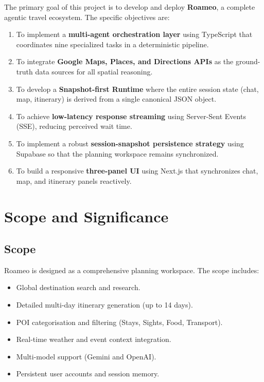 \documentclass[12pt,a4paper]{report}
\begin{document}
The primary goal of this project is to develop and deploy \textbf{Roameo}, a complete agentic travel ecosystem. The specific objectives are:

\begin{enumerate}[leftmargin=*, nosep]
  \item To implement a \textbf{multi-agent orchestration layer} using TypeScript that coordinates nine specialized tasks in a deterministic pipeline.
  \item To integrate \textbf{Google Maps, Places, and Directions APIs} as the ground-truth data sources for all spatial reasoning.
  \item To develop a \textbf{Snapshot-first Runtime} where the entire session state (chat, map, itinerary) is derived from a single canonical JSON object.
  \item To achieve \textbf{low-latency response streaming} using Server-Sent Events (SSE), reducing perceived wait time.
  \item To implement a robust \textbf{session-snapshot persistence strategy} using Supabase so that the planning workspace remains synchronized.
  \item To build a responsive \textbf{three-panel UI} using Next.js that synchronizes chat, map, and itinerary panels reactively.
\end{enumerate}

\section{Scope and Significance}

\subsection{Scope}
Roameo is designed as a comprehensive planning workspace. The scope includes:
\begin{itemize}[nosep]
    \item Global destination search and research.
    \item Detailed multi-day itinerary generation (up to 14 days).
    \item POI categorisation and filtering (Stays, Sights, Food, Transport).
    \item Real-time weather and event context integration.
    \item Multi-model support (Gemini and OpenAI).
    \item Persistent user accounts and session memory.
\end{itemize}
\end{document}
